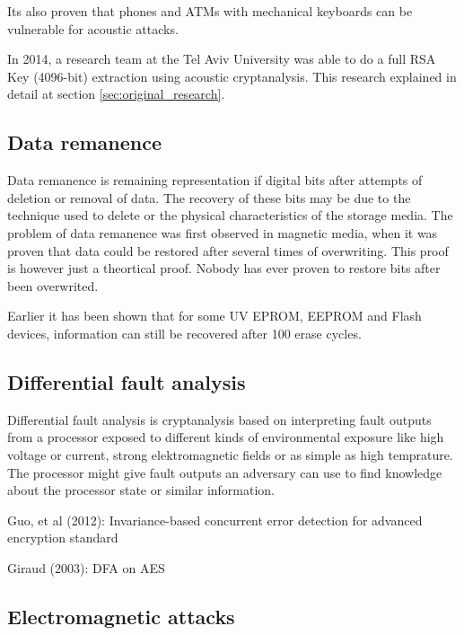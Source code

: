 Its also proven that phones and ATMs with mechanical keyboards can be vulnerable for acoustic attacks\cite{KybdEmanation}.

In 2014, a research team at the Tel Aviv University was able to do a full RSA Key (4096-bit) extraction using acoustic cryptanalysis. 
This research explained in detail at section \ref{sec:original_research}.

\subsection{Data remanence}\label{sec:data_remanence}

Data remanence is remaining representation if digital bits after attempts of deletion or removal of data. 
The recovery of these bits may be due to the technique used to delete or the physical characteristics of the storage media. 
The problem of data remanence was first observed in magnetic media, when it was proven that data could be restored after several times of overwriting. 
This proof is however just a theortical proof. 
Nobody has ever proven to restore bits after been overwrited. 

Earlier it has been shown that for some UV EPROM, EEPROM and Flash devices, information can still be recovered after 100 erase cycles\cite{data_remanence_flash}.


\subsection{Differential fault analysis}\label{sec:differential_fault_analysis}

Differential fault analysis is cryptanalysis based on interpreting fault outputs from a processor exposed to different kinds of environmental exposure like high voltage or current, strong elektromagnetic fields or as simple as high temprature. 
The processor might give fault outputs an adversary can use to find knowledge about the processor state or similar information.


Guo, et al (2012): Invariance-based concurrent error detection for advanced encryption standard\cite{dfa_guo}

Giraud (2003): DFA on AES\cite{dfa_aes}

\subsection{Electromagnetic attacks}\label{sec:electromagnetic_attacks}

